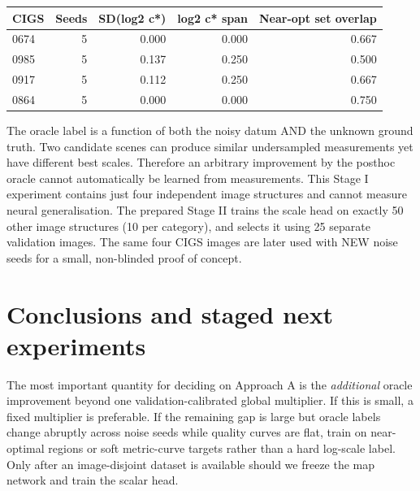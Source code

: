 \documentclass[11pt,a4paper]{article}
\begin{document}
\begin{center}
\small
\begin{tabular}{lrrrr}
\toprule
CIGS & Seeds & SD(log2 c*) & log2 c* span & Near-opt set overlap\\
\midrule
0674 & 5 & 0.000 & 0.000 & 0.667\\
0985 & 5 & 0.137 & 0.250 & 0.500\\
0917 & 5 & 0.112 & 0.250 & 0.667\\
0864 & 5 & 0.000 & 0.000 & 0.750\\
\bottomrule
\end{tabular}
\end{center}

The oracle label is a function of both the noisy datum AND the unknown ground truth. Two candidate scenes can produce similar undersampled measurements yet have different best scales. Therefore an arbitrary improvement by the posthoc oracle cannot automatically be learned from measurements. This Stage I experiment contains just four independent image structures and cannot measure neural generalisation. The prepared Stage II trains the scale head on exactly 50 other image structures (10 per category), and selects it using 25 separate validation images. The same four CIGS images are later used with NEW noise seeds for a small, non-blinded proof of concept.

\section{Conclusions and staged next experiments}

The most important quantity for deciding on Approach A is the \emph{additional} oracle improvement beyond one validation-calibrated global multiplier. If this is small, a fixed multiplier is preferable. If the remaining gap is large but oracle labels change abruptly across noise seeds while quality curves are flat, train on near-optimal regions or soft metric-curve targets rather than a hard log-scale label. Only after an image-disjoint dataset is available should we freeze the map network and train the scalar head.
\end{document}
